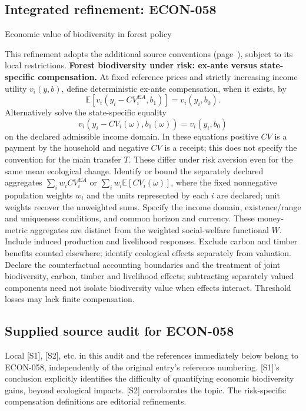 \documentclass[11pt,a4paper]{article}
\begin{document}
\subsection*{Integrated refinement: ECON-058}
{\sffamily\small\color{muted}Economic value of biodiversity in forest policy\par}
This refinement adopts the additional source conventions
(page~\pageref{audited:conventions}), subject to its local restrictions.
\textbf{Forest biodiversity under risk: ex-ante versus state-specific compensation.}
At fixed reference prices and strictly increasing income utility $v_i(y,b)$,
define deterministic ex-ante compensation, when it exists, by
\[
\mathbb E[v_i(y_i-CV_i^{EA},b_1)]=v_i(y_i,b_0).
\]
Alternatively solve the state-specific equality
\[
v_i(y_i-CV_i(\omega),b_1(\omega))=v_i(y_i,b_0)
\]
on the declared admissible income domain. In these equations positive $CV$ is a payment by the household and negative $CV$ is a receipt; this does not specify the convention for the main transfer $T$. These differ under risk aversion even for the same mean ecological
change. Identify or bound the separately declared aggregates
$\sum_i w_iCV_i^{EA}$ or $\sum_i w_i\mathbb E[CV_i(\omega)]$, where the fixed nonnegative population weights $w_i$ and the units represented by each $i$ are declared; unit weights recover the unweighted sums. Specify the
income domain, existence/range and uniqueness conditions, and common horizon and
currency. These money-metric aggregates are distinct from the weighted social-welfare functional $W$. Include induced production and livelihood responses. Exclude carbon
and timber benefits counted elsewhere; identify ecological effects separately
from valuation. Declare the counterfactual accounting boundaries and the treatment of joint biodiversity, carbon, timber and livelihood effects; subtracting separately valued components need not isolate biodiversity value when effects interact. Threshold losses may lack finite compensation.
\subsection*{Supplied source audit for ECON-058}
Local [S1], [S2], etc. in this audit and the references immediately below
belong to ECON-058, independently of the original entry's reference numbering.
[S1]'s conclusion explicitly identifies the difficulty of quantifying economic biodiversity gains, beyond ecological impacts. [S2] corroborates the topic. The risk-specific compensation definitions are editorial refinements.
\end{document}
